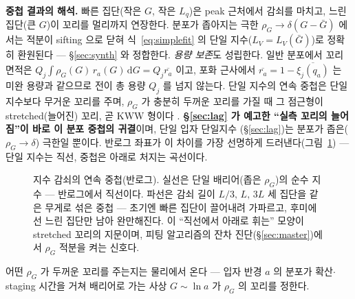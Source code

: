 \documentclass[11pt,a4paper]{article}
\newcommand{\dd}{\mathrm{d}}
\begin{document}
\textbf{중첩 결과의 해석.} 빠른 집단(작은 $G$, 작은 $L_q$)은 peak 근처에서 감쇠를 마치고, 느린 집단(큰 $G$)이
꼬리를 멀리까지 연장한다. 분포가 좁아지는 극한 $\rho_G\to\delta(G-\bar G)$ 에서는 적분이 sifting 으로 닫혀
식~\eqref{eq:simplefit} 의 단일 지수($L_V=L_V(\bar G)$)로 정확히 환원된다 — \S\ref{sec:synth} 와 정합한다.
\emph{용량 보존}도 성립한다. 일반 분포에서 꼬리 면적은 $Q_j\!\int\!\rho_G(G)\,r_a(G)\,\dd G=Q_j\overline{r_a}$
이고, 포화 근사에서 $\overline{r_a}=1-\overline{\xi_j(q_a)}$ 는 미완 용량과 같으므로 전이 총 용량 $Q_j$ 를 넘지
않는다. 단일 지수의 연속 중첩은 단일 지수보다 무거운 꼬리를 주며, $\rho_G$ 가 충분히 두꺼운 꼬리를 가질 때 그
점근형이 stretched(늘어진) 꼬리, 곧 KWW 형이다 \cite{lindsey1980,johnston2006,svare2000}.
\textbf{\S\ref{sec:lag} 가 예고한 ``실측 꼬리의 늘어짐''이 바로 이 분포 중첩의 귀결}이며, 단일 입자 단일지수
(\S\ref{sec:lag})는 분포가 좁은($\rho_G\to\delta$) 극한일 뿐이다. 반로그 좌표가 이 차이를 가장 선명하게
드러낸다(그림~\ref{fig:superpose}) — 단일 지수는 직선, 중첩은 아래로 처지는 곡선이다.
\begin{figure}[t]
\centering
{}
\caption{지수 감쇠의 연속 중첩(반로그). 실선은 단일 배리어(좁은 $\rho_G$)의 순수 지수 — 반로그에서 직선이다.
파선은 감쇠 길이 $L/3,\,L,\,3L$ 세 집단을 같은 무게로 섞은 중첩 — 초기엔 빠른 집단이 끌어내려 가파르고,
후미에선 느린 집단만 남아 완만해진다. 이 ``직선에서 아래로 휘는'' 모양이 stretched 꼬리의 지문이며, 피팅
알고리즘의 잔차 진단(\S\ref{sec:master})에서 $\rho_G$ 적분을 켜는 신호다.}
\label{fig:superpose}
\end{figure} 어떤 $\rho_G$ 가 두꺼운 꼬리를 주는지는
물리에서 온다 — 입자 반경 $a$ 의 분포가 확산$\cdot$staging 시간을 거쳐 배리어로 가는 사상 $G\sim\ln a$ 가
$\rho_G$ 의 꼬리를 정한다.
\end{document}
